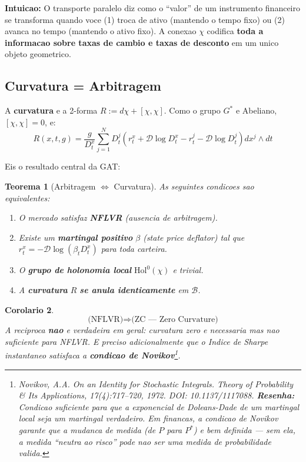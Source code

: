\documentclass[12pt,a4paper]{article}
\newtheorem{teo}{Teorema}[section]
\newtheorem{coro}[teo]{Corolario}
\theoremstyle{remark}
\begin{document}
\textbf{Intuicao:} O transporte paralelo diz como o ``valor'' de um
instrumento financeiro se transforma quando voce (1) troca de ativo
(mantendo o tempo fixo) ou (2) avanca no tempo (mantendo o ativo fixo).
A conexao $\chi$ codifica \textbf{toda a informacao sobre taxas de cambio
e taxas de desconto} em um unico objeto geometrico.

\subsection{Curvatura = Arbitragem}

A \textbf{curvatura} e a 2-forma $R := d\chi + [\chi,\chi]$. Como o grupo
$G^*$ e Abeliano, $[\chi,\chi] = 0$, e:
\[
R(x,t,g) = \frac{g}{D_t^x}\sum_{j=1}^N D_t^j\left(r_t^x + \mathcal{D}\log D_t^x -
           r_t^j - \mathcal{D}\log D_t^j\right) dx^j \wedge dt
\]

Eis o resultado central da GAT:

\begin{teo}[Arbitragem $\Leftrightarrow$ Curvatura]
As seguintes condicoes sao equivalentes:
\begin{enumerate}[label=(\roman*),nosep]
  \item O mercado satisfaz \textbf{NFLVR} (ausencia de arbitragem).
  \item Existe um \textbf{martingal positivo} $\beta$ (state price deflator)
        tal que $r_t^x = -\mathcal{D}\log(\beta_t D_t^x)$ para toda carteira.
  \item O \textbf{grupo de holonomia local} $\text{Hol}^0(\chi)$ e trivial.
  \item A \textbf{curvatura} $R$ \textbf{se anula identicamente} em $\mathcal{B}$.
\end{enumerate}
\end{teo}

\begin{coro}
\[
\text{(NFLVR)} \Rightarrow \text{(ZC — Zero Curvature)}
\]
A reciproca \textbf{nao} e verdadeira em geral: curvatura zero e necessaria mas
nao suficiente para NFLVR. E preciso adicionalmente que o Indice de Sharpe
instantaneo satisfaca a \textbf{condicao de Novikov}\footnote{Novikov, A.A.
\textit{On an Identity for Stochastic Integrals}. Theory of Probability \& Its
Applications, 17(4):717--720, 1972. DOI: 10.1137/1117088. \textbf{Resenha:}
Condicao suficiente para que a exponencial de Doleans-Dade de um martingal
local seja um martingal verdadeiro. Em financas, a condicao de Novikov garante
que a mudanca de medida (de $P$ para $P^*$) e bem definida — sem ela, a medida
``neutra ao risco'' pode nao ser uma medida de probabilidade valida.}.
\end{coro}
\end{document}
